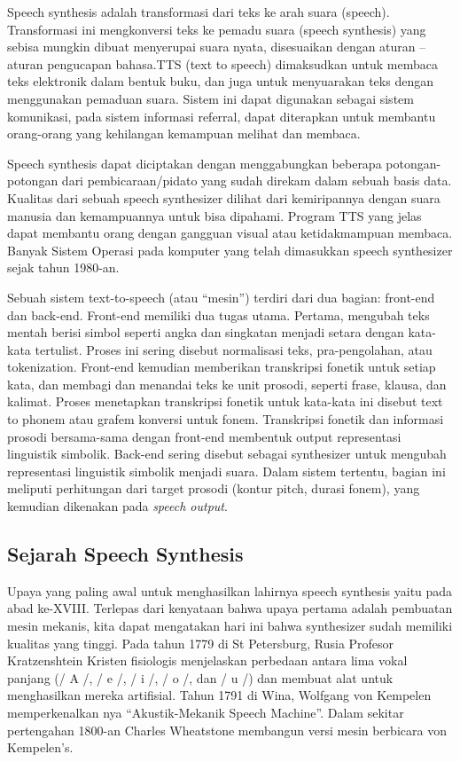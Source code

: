 Speech synthesis adalah transformasi dari teks ke arah suara (speech). Transformasi ini mengkonversi teks ke pemadu suara (speech synthesis) yang sebisa mungkin dibuat menyerupai suara nyata, disesuaikan dengan aturan – aturan pengucapan bahasa.TTS (text to speech) dimaksudkan untuk membaca teks elektronik dalam bentuk buku, dan juga untuk menyuarakan teks dengan menggunakan pemaduan suara. Sistem ini dapat digunakan sebagai sistem komunikasi, pada sistem informasi referral, dapat diterapkan untuk membantu orang-orang yang kehilangan kemampuan melihat dan membaca\cite{8639589}.

Speech synthesis dapat diciptakan dengan menggabungkan beberapa potongan-potongan dari pembicaraan/pidato yang sudah direkam dalam sebuah basis data. Kualitas dari sebuah speech synthesizer dilihat dari kemiripannya dengan suara manusia dan kemampuannya untuk bisa dipahami. Program TTS yang jelas dapat membantu orang dengan gangguan visual atau ketidakmampuan membaca. Banyak Sistem Operasi pada komputer yang telah dimasukkan speech synthesizer sejak tahun 1980-an.

Sebuah sistem text-to-speech (atau “mesin”) terdiri dari dua bagian: front-end dan back-end. Front-end memiliki dua tugas utama. Pertama, mengubah teks mentah berisi simbol seperti angka dan singkatan menjadi setara dengan kata-kata tertulist. Proses ini sering disebut normalisasi teks, pra-pengolahan, atau tokenization. Front-end kemudian memberikan transkripsi fonetik untuk setiap kata, dan membagi dan menandai teks ke unit prosodi, seperti frase, klausa, dan kalimat. Proses menetapkan transkripsi fonetik untuk kata-kata ini disebut text to phonem atau grafem konversi untuk fonem. Transkripsi fonetik dan informasi prosodi bersama-sama dengan front-end membentuk output representasi linguistik simbolik. Back-end sering disebut sebagai synthesizer untuk mengubah representasi linguistik simbolik menjadi suara. Dalam sistem tertentu, bagian ini meliputi perhitungan dari target prosodi (kontur pitch, durasi fonem), yang kemudian dikenakan pada \textit{speech output}.

\subsection{Sejarah Speech Synthesis}
Upaya yang paling awal untuk menghasilkan lahirnya speech synthesis yaitu pada abad ke-XVIII. Terlepas dari kenyataan bahwa upaya pertama adalah pembuatan mesin mekanis, kita dapat mengatakan hari ini  bahwa synthesizer sudah memiliki kualitas yang tinggi. Pada tahun 1779 di St Petersburg, Rusia Profesor Kratzenshtein Kristen fisiologis menjelaskan perbedaan antara lima vokal panjang  (/ A /, / e /, / i /, / o /, dan / u /) dan membuat alat untuk menghasilkan mereka artifisial. Tahun 1791 di Wina, Wolfgang von Kempelen memperkenalkan nya “Akustik-Mekanik Speech Machine”. Dalam sekitar pertengahan 1800-an Charles Wheatstone membangun versi mesin berbicara von Kempelen’s.

